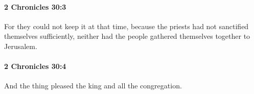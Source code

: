 		\paragraph{2 Chronicles 30:3} %
			\label{2CHRONICLES-30-3}

			For they could not keep it at that time, because the priests had not sanctified themselves sufficiently, neither had the people gathered themselves together to Jerusalem.


		\paragraph{2 Chronicles 30:4} %
			\label{2CHRONICLES-30-4}

			And the thing pleased the king and all the congregation.


